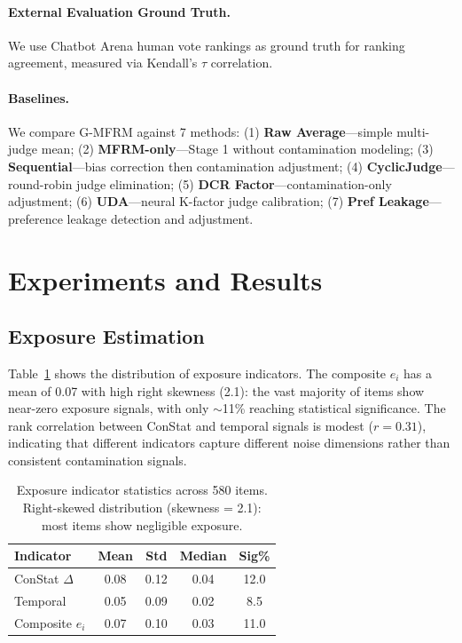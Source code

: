 \documentclass[11pt]{article}
\begin{document}
\paragraph{External Evaluation Ground Truth.}
We use Chatbot Arena human vote rankings as ground truth for ranking agreement, measured via Kendall's $\tau$ correlation.

\paragraph{Baselines.}
We compare G-MFRM against 7 methods: (1) \textbf{Raw Average}---simple multi-judge mean; (2) \textbf{MFRM-only}---Stage 1 without contamination modeling; (3) \textbf{Sequential}---bias correction then contamination adjustment; (4) \textbf{CyclicJudge}---round-robin judge elimination; (5) \textbf{DCR Factor}---contamination-only adjustment; (6) \textbf{UDA}---neural K-factor judge calibration; (7) \textbf{Pref Leakage}---preference leakage detection and adjustment.

\section{Experiments and Results}
\label{sec:experiments}

\subsection{Exposure Estimation}
\label{sec:exposure}

Table~\ref{tab:exposure} shows the distribution of exposure indicators. The composite $e_i$ has a mean of 0.07 with high right skewness (2.1): the vast majority of items show near-zero exposure signals, with only $\sim$11\% reaching statistical significance. The rank correlation between ConStat and temporal signals is modest ($r = 0.31$), indicating that different indicators capture different noise dimensions rather than consistent contamination signals.

\begin{table}[t]
\centering
\small
\begin{tabular}{lcccc}
\toprule
Indicator & Mean & Std & Median & Sig\% \\
\midrule
ConStat $\Delta$ & 0.08 & 0.12 & 0.04 & 12.0 \\
Temporal & 0.05 & 0.09 & 0.02 & 8.5 \\
Composite $e_i$ & 0.07 & 0.10 & 0.03 & 11.0 \\
\bottomrule
\end{tabular}
\caption{Exposure indicator statistics across 580 items. Right-skewed distribution (skewness = 2.1): most items show negligible exposure.}
\label{tab:exposure}
\end{table}
\end{document}
